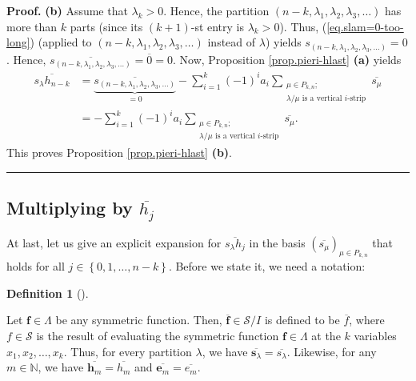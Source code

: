 \documentclass[numbers=enddot,12pt,final,onecolumn,notitlepage]{scrartcl}%
\theoremstyle{definition}
\newtheorem{defi}[theo]{Definition}
\newenvironment{definition}[1][]
{\begin{defi}[#1]\begin{leftbar}}
{\end{leftbar}\end{defi}}
\newenvironment{proof}[1][Proof]{\noindent\textbf{#1.} }{\ \rule{0.5em}{0.5em}}
\let\sumnonlimits\sum
\renewcommand{\sum}{\sumnonlimits\limits}
\begin{document}
\begin{proof}
\textbf{(b)} Assume that $\lambda_{k}>0$. Hence, the partition $\left(
n-k,\lambda_{1},\lambda_{2},\lambda_{3},\ldots\right)  $ has more than $k$
parts (since its $\left(  k+1\right)  $-st entry is $\lambda_{k}>0$). Thus,
(\ref{eq.slam=0-too-long}) (applied to $\left(  n-k,\lambda_{1},\lambda
_{2},\lambda_{3},\ldots\right)  $ instead of $\lambda$) yields $s_{\left(
n-k,\lambda_{1},\lambda_{2},\lambda_{3},\ldots\right)  }=0$. Hence,
$\overline{s_{\left(  n-k,\lambda_{1},\lambda_{2},\lambda_{3},\ldots\right)
}}=\overline{0}=0$. Now, Proposition \ref{prop.pieri-hlast} \textbf{(a)}
yields%
\begin{align*}
\overline{s_{\lambda}h_{n-k}}  &  =\underbrace{\overline{s_{\left(
n-k,\lambda_{1},\lambda_{2},\lambda_{3},\ldots\right)  }}}_{=0}-\sum_{i=1}%
^{k}\left(  -1\right)  ^{i}a_{i}\sum_{\substack{\mu\in P_{k,n};\\\lambda
/\mu\text{ is a vertical }i\text{-strip}}}\overline{s_{\mu}}\\
&  =-\sum_{i=1}^{k}\left(  -1\right)  ^{i}a_{i}\sum_{\substack{\mu\in
P_{k,n};\\\lambda/\mu\text{ is a vertical }i\text{-strip}}}\overline{s_{\mu}}.
\end{align*}
This proves Proposition \ref{prop.pieri-hlast} \textbf{(b)}.
\end{proof}

\subsection{Multiplying by $\overline{h_{j}}$}

At last, let us give an explicit expansion for $\overline{s_{\lambda}h_{j}}$
in the basis $\left(  \overline{s_{\mu}}\right)  _{\mu\in P_{k,n}}$ that holds
for all $j\in\left\{  0,1,\ldots,n-k\right\}  $. Before we state it, we need a notation:

\begin{definition}
Let $\mathbf{f}\in\Lambda$ be any symmetric function. Then, $\overline
{\mathbf{f}}\in\mathcal{S}/I$ is defined to be $\overline{f}$, where
$f\in\mathcal{S}$ is the result of evaluating the symmetric function
$\mathbf{f}\in\Lambda$ at the $k$ variables $x_{1},x_{2},\ldots,x_{k}$. Thus,
for every partition $\lambda$, we have $\overline{\mathbf{s}_{\lambda}%
}=\overline{s_{\lambda}}$. Likewise, for any $m\in\mathbb{N}$, we have
$\overline{\mathbf{h}_{m}}=\overline{h_{m}}$ and $\overline{\mathbf{e}_{m}%
}=\overline{e_{m}}$.
\end{definition}
\end{document}
